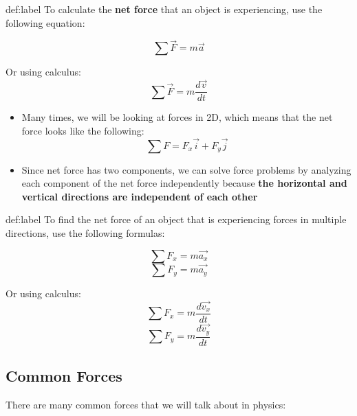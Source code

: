 \begin{definition}{def:label}
	To calculate the \textbf{net force} that an object is experiencing, use the following equation:

	$$
		\sum{\vec{F}} = m\vec{a}
	$$

	Or using calculus:
	$$
		\sum{\vec{F}} = m\frac{d\vec{v}}{{dt}}
	$$
\end{definition}

\begin{itemize}
	\item Many times, we will be looking at forces in 2D, which means that the net force looks like the following:
	$$
		\sum F = F_x \vec{i} + F_y \vec{j}
	$$
	\item Since net force has two components, we can solve force problems by analyzing each component of the net force independently because \textbf{the horizontal and vertical directions are independent of each other}
\end{itemize}

\begin{definition}{def:label}
	To find the net force of an object that is experiencing forces in multiple directions, use the following formulas:

	$$
		\sum F_x = m\vec{a_x}
	$$
	$$
		\sum F_y = m\vec{a_y}
	$$

	Or using calculus:
	$$
		\sum F_x = m\frac{d\vec{v_x}}{dt}
	$$
	$$
		\sum F_y = m\frac{d\vec{v_y}}{dt}
	$$
\end{definition}

\subsection{Common Forces}

There are many common forces that we will talk about in physics:

